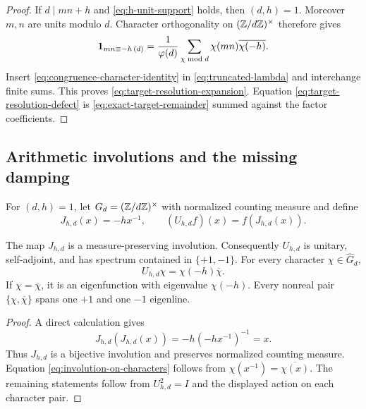 \begin{proof}
If $d\mid mn+h$ and \eqref{eq:h-unit-support} holds, then $(d,h)=1$.
Moreover $m,n$ are units modulo $d$.  Character orthogonality on
$(\mathbb Z/d\mathbb Z)^\times$ therefore gives
\begin{equation}\label{eq:congruence-character-identity}
 \mathbf 1_{mn\equiv-h\, (d)}
 =\frac1{\varphi(d)}\sum_{\chi\bmod d}
   \chi(mn)\overline{\chi(-h)}.
\end{equation}
Insert \eqref{eq:congruence-character-identity} in
\eqref{eq:truncated-lambda} and interchange finite sums.  This proves
\eqref{eq:target-resolution-expansion}.  Equation
\eqref{eq:target-resolution-defect} is \eqref{eq:exact-target-remainder}
summed against the factor coefficients.
\end{proof}

\subsection{Arithmetic involutions and the missing damping}

For $(d,h)=1$, let $G_d=(\mathbb Z/d\mathbb Z)^\times$ with normalized counting measure
and define
\begin{equation}\label{eq:arithmetic-involution}
 J_{h,d}(x)=-h x^{-1},
 \qquad
 (U_{h,d}f)(x)=f(J_{h,d}(x)).
\end{equation}

\begin{proposition}\label{prop:involution-spectrum}
The map $J_{h,d}$ is a measure-preserving involution.  Consequently
$U_{h,d}$ is unitary, self-adjoint, and has spectrum contained in
$\{+1,-1\}$.  For every character $\chi\in\widehat G_d$,
\begin{equation}\label{eq:involution-on-characters}
 U_{h,d}\chi=\chi(-h)\overline\chi.
\end{equation}
If $\chi=\overline\chi$, it is an eigenfunction with eigenvalue
$\chi(-h)$.  Every nonreal pair $\{\chi,\overline\chi\}$ spans one
$+1$ and one $-1$ eigenline.
\end{proposition}

\begin{proof}
A direct calculation gives
\[
 J_{h,d}(J_{h,d}(x))
 =-h(-hx^{-1})^{-1}=x.
\]
Thus $J_{h,d}$ is a bijective involution and preserves normalized counting
measure.  Equation \eqref{eq:involution-on-characters} follows from
$\chi(x^{-1})=\overline{\chi(x)}$.  The remaining statements follow from
$U_{h,d}^2=I$ and the displayed action on each character pair.
\end{proof}

